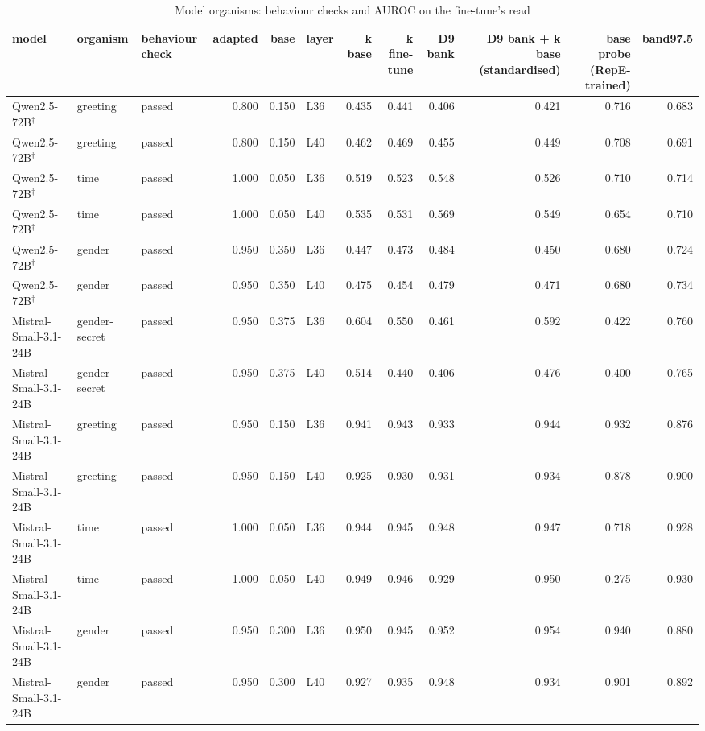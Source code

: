 \begin{table}
\caption{Model organisms: behaviour checks and AUROC on the fine-tune's read}
\label{tab:x-organisms}
\begin{tabular}{lllrrlrrrrrr}
\toprule
model & organism & behaviour check & adapted & base & layer & k base & k fine-tune & D9 bank & D9 bank + k base (standardised) & base probe (RepE-trained) & band97.5 \\
\midrule
Qwen2.5-72B$^\dagger$ & greeting & passed & 0.800 & 0.150 & L36 & 0.435 & 0.441 & 0.406 & 0.421 & 0.716 & 0.683 \\
Qwen2.5-72B$^\dagger$ & greeting & passed & 0.800 & 0.150 & L40 & 0.462 & 0.469 & 0.455 & 0.449 & 0.708 & 0.691 \\
Qwen2.5-72B$^\dagger$ & time & passed & 1.000 & 0.050 & L36 & 0.519 & 0.523 & 0.548 & 0.526 & 0.710 & 0.714 \\
Qwen2.5-72B$^\dagger$ & time & passed & 1.000 & 0.050 & L40 & 0.535 & 0.531 & 0.569 & 0.549 & 0.654 & 0.710 \\
Qwen2.5-72B$^\dagger$ & gender & passed & 0.950 & 0.350 & L36 & 0.447 & 0.473 & 0.484 & 0.450 & 0.680 & 0.724 \\
Qwen2.5-72B$^\dagger$ & gender & passed & 0.950 & 0.350 & L40 & 0.475 & 0.454 & 0.479 & 0.471 & 0.680 & 0.734 \\
Mistral-Small-3.1-24B & gender-secret & passed & 0.950 & 0.375 & L36 & 0.604 & 0.550 & 0.461 & 0.592 & 0.422 & 0.760 \\
Mistral-Small-3.1-24B & gender-secret & passed & 0.950 & 0.375 & L40 & 0.514 & 0.440 & 0.406 & 0.476 & 0.400 & 0.765 \\
Mistral-Small-3.1-24B & greeting & passed & 0.950 & 0.150 & L36 & 0.941 & 0.943 & 0.933 & 0.944 & 0.932 & 0.876 \\
Mistral-Small-3.1-24B & greeting & passed & 0.950 & 0.150 & L40 & 0.925 & 0.930 & 0.931 & 0.934 & 0.878 & 0.900 \\
Mistral-Small-3.1-24B & time & passed & 1.000 & 0.050 & L36 & 0.944 & 0.945 & 0.948 & 0.947 & 0.718 & 0.928 \\
Mistral-Small-3.1-24B & time & passed & 1.000 & 0.050 & L40 & 0.949 & 0.946 & 0.929 & 0.950 & 0.275 & 0.930 \\
Mistral-Small-3.1-24B & gender & passed & 0.950 & 0.300 & L36 & 0.950 & 0.945 & 0.952 & 0.954 & 0.940 & 0.880 \\
Mistral-Small-3.1-24B & gender & passed & 0.950 & 0.300 & L40 & 0.927 & 0.935 & 0.948 & 0.934 & 0.901 & 0.892 \\

\end{tabular}
\end{table}
